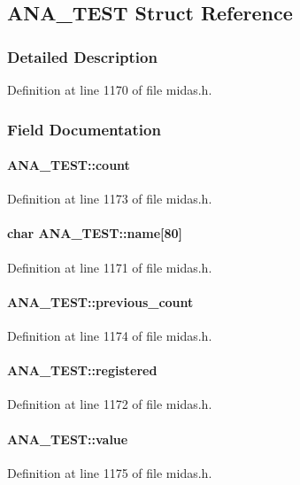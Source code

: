 \subsection{ANA\_\-TEST Struct Reference}
\label{structANA__TEST}


\subsubsection{Detailed Description}


Definition at line 1170 of file midas.h.

\subsubsection{Field Documentation}
\paragraph[{count}]{ {\bf ANA\_\-TEST::count}}\hfill\label{structANA__TEST_a76f53e0e2afd1fcfc50195a05d715227}


Definition at line 1173 of file midas.h.
\paragraph[{name}]{\setlength{\rightskip}{0pt plus 5cm}char {\bf ANA\_\-TEST::name}\mbox{[}80\mbox{]}}\hfill\label{structANA__TEST_a78011254bcac3b60037eabf004d93338}


Definition at line 1171 of file midas.h.
\paragraph[{previous\_\-count}]{ {\bf ANA\_\-TEST::previous\_\-count}}\hfill\label{structANA__TEST_a5ee41276f9dce888b678fd7319ccfa05}


Definition at line 1174 of file midas.h.
\paragraph[{registered}]{ {\bf ANA\_\-TEST::registered}}\hfill\label{structANA__TEST_a7b6db64e56a7eca12d6efb6cb64748fa}


Definition at line 1172 of file midas.h.
\paragraph[{value}]{ {\bf ANA\_\-TEST::value}}\hfill\label{structANA__TEST_af1cbe49e3d68b42b77c02eb7c5e175fb}


Definition at line 1175 of file midas.h.